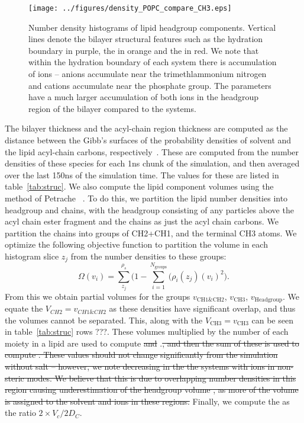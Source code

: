 \begin{figure}[H]
    \texttt{[image: ../figures/density\_POPC\_compare\_CH3.eps]}
    \caption[Number densities of lipid headgroup moieties]{Number density histograms of lipid headgroup components. Vertical lines denote the bilayer structural features such as the hydration boundary in purple, the \dhh{} in orange and the \dc{} in red. We note
    that within the hydration boundary of each system there is accumulation of ions -- anions accumulate near the trimethlammonium nitrogen and cations accumulate near the phosphate group. The  parameters
have a much larger accumulation of both ions in the headgroup region of the bilayer compared to the  systems.}
    \label{fig:soldens}
\end{figure}

The bilayer thickness \db{} and the acyl-chain region thickness \dc{} are computed as the distance between the Gibb's surfaces of the probability densities of solvent and the lipid acyl-chain carbons, respectively~\cite{fogarty:2015}.
These are computed from the number densities of these species for each 1ns chunk of the simulation, and then averaged over the last 150ns of the simulation time.
The values for these are listed in table~\ref{tab:struc}.
We also compute the lipid component volumes using the method of Petrache \etal{}~\cite{petrache:1997}. To do this, we partition the lipid number densities into
headgroup and chains, with the headgroup consisting of any particles above the acyl chain ester fragment and the chains as just the acyl chain carbons. We partition the
chains into groups of CH2+CH1, and the terminal CH3 atoms. We optimize the following objective function to partition the volume in each histogram slice $z_j$ from the number densities to these groups:
\begin{equation}
    \Omega{(v_i)}=\sum^{\rho_s}_{z_j}\bigg(1-\sum^{N_{\text{groups}}}_{i=1}\big(\rho_i(z_j)(v_i)^2\bigg)\text{.}
\end{equation}
From this we obtain partial volumes for the groups $v_{\text{CH1\&CH2}}$, $v_{\text{CH3}}$, $v_{\text{Headgroup}}$. We equate the $V_{CH2}=v_{CH1\&CH2}$ as these densities have significant overlap,
and thus the volumes cannot be separated. This, along with the $V_{\text{CH3}}=v_{\text{CH3}}$ can be seen in table~\ref{tab:struc} rows ???. These volumes multiplied by the number of each
moiety in a lipid are used to compute \st{\Vh and} \Vc.\st{, and then the sum of these is used to compute \Vl. These values should not change significantly from the simulation without salt -- however, we note decreasing
\Vl in the the systems with ions
in non-steric modes.
We believe that this is due to overlapping number densities in this
region causing underestimation of the headgroup volume \Vh, as more of the volume is assigned to the solvent and ions
in these regions.}
Finally, we compute the \al as the ratio $2\times{}V_c/2D_C$.

